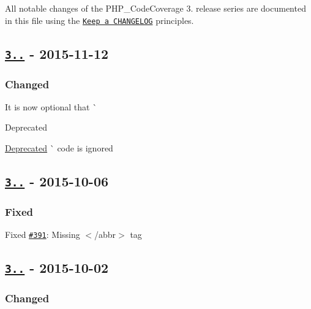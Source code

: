All notable changes of the P\+H\+P\+\_\+\+Code\+Coverage 3. release series are documented in this file using the \href{http://keepachangelog.com/}{\tt Keep a C\+H\+A\+N\+G\+E\+L\+OG} principles.

\subsection*{\href{https://github.com/sebastianbergmann/php-code-coverage/compare/3.0.1...3.0.2}{\tt 3..} -\/ 2015-\/11-\/12}

\subsubsection*{Changed}


\begin{DoxyItemize}
\item It is now optional that \`{}\begin{DoxyRefDesc}{Deprecated}
\item[\mbox{\hyperlink{deprecated__deprecated000025}{Deprecated}}]\`{} code is ignored\end{DoxyRefDesc}

\end{DoxyItemize}

\subsection*{\href{https://github.com/sebastianbergmann/php-code-coverage/compare/3.0.0...3.0.1}{\tt 3..} -\/ 2015-\/10-\/06}

\subsubsection*{Fixed}


\begin{DoxyItemize}
\item Fixed \href{https://github.com/sebastianbergmann/php-code-coverage/pull/391}{\tt \#391}\+: Missing {\ttfamily $<$/abbr$>$} tag
\end{DoxyItemize}

\subsection*{\href{https://github.com/sebastianbergmann/php-code-coverage/compare/2.2...3.0.0}{\tt 3..} -\/ 2015-\/10-\/02}

\subsubsection*{Changed}



